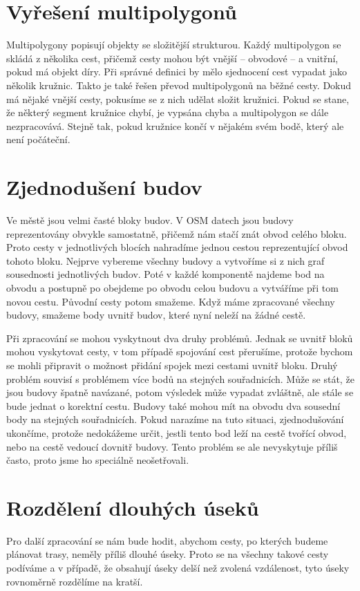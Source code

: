 \section{Vyřešení multipolygonů}
Multipolygony popisují objekty se složitější strukturou. Každý multipolygon se
skládá z několika cest, přičemž cesty mohou být vnější -- obvodové -- a
vnitřní, pokud má objekt díry. Při správné definici by mělo sjednocení cest
vypadat jako několik kružnic. Takto je také řešen převod multipolygonů na běžné
cesty. Dokud má nějaké vnější cesty, pokusíme se z nich udělat složit kružnici.
Pokud se stane, že některý segment kružnice chybí, je vypsána chyba a
multipolygon se dále nezpracovává. Stejně tak, pokud kružnice končí v nějakém
svém bodě, který ale není počáteční. 

\section{Zjednodušení budov}
Ve městě jsou velmi časté bloky budov. V OSM datech jsou budovy reprezentovány
obvykle samostatně, přičemž nám stačí znát obvod celého bloku. Proto cesty v
jednotlivých blocích nahradíme jednou cestou reprezentující obvod tohoto bloku.
Nejprve vybereme všechny budovy a vytvoříme si z nich graf sousednosti
jednotlivých budov. Poté v každé komponentě najdeme bod na obvodu a postupně
po obejdeme po obvodu celou budovu a vytváříme při tom novou cestu. Původní
cesty potom smažeme. Když máme zpracované všechny budovy, smažeme body uvnitř
budov, které nyní neleží na žádné cestě.

Při zpracování se mohou vyskytnout dva druhy problémů. Jednak se uvnitř bloků
mohou vyskytovat cesty, v tom případě spojování cest přerušíme, protože bychom
se mohli připravit o možnost přidání spojek mezi cestami uvnitř bloku. Druhý
problém souvisí s problémem více bodů na stejných souřadnicích. Může se stát, že
jsou budovy špatně navázané, potom výsledek může vypadat zvláštně, ale stále se
bude jednat o korektní cestu. Budovy také mohou mít na obvodu dva sousední body
na stejných souřadnicích. Pokud narazíme na tuto situaci, zjednodušování
ukončíme, protože nedokážeme určit, jestli tento bod leží na cestě tvořící
obvod, nebo na cestě vedoucí dovnitř budovy. Tento problém se ale nevyskytuje
příliš často, proto jsme ho speciálně neošetřovali.

\section{Rozdělení dlouhých úseků}
Pro další zpracování se nám bude hodit, abychom cesty, po kterých budeme
plánovat trasy, neměly příliš dlouhé úseky. Proto se na všechny takové cesty
podíváme a v případě, že obsahují úseky delší než zvolená vzdálenost, tyto úseky
rovnoměrně rozdělíme na kratší. 

